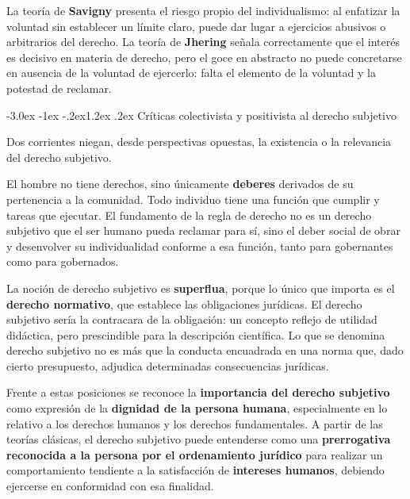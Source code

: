 \documentclass[12pt,oneside]{book}
\makeatletter
\renewcommand\section{\@startsection{section}{1}{\z@}%
  {-3.0ex \@plus -1ex \@minus -.2ex}{1.2ex \@plus .2ex}%
  {\normalfont\large\bfseries\color{acento}}}
\makeatother
\begin{document}
\begin{importante}
La teoría de \textbf{Savigny} presenta el riesgo propio del individualismo: al enfatizar la voluntad sin establecer un límite claro, puede dar lugar a ejercicios abusivos o arbitrarios del derecho. La teoría de \textbf{Jhering} señala correctamente que el interés es decisivo en materia de derecho, pero el goce en abstracto no puede concretarse en ausencia de la voluntad de ejercerlo: falta el elemento de la voluntad y la potestad de reclamar.
\end{importante}

\section{Críticas colectivista y positivista al derecho subjetivo}

Dos corrientes niegan, desde perspectivas opuestas, la existencia o la relevancia del derecho subjetivo.

\begin{definicion}
El hombre no tiene derechos, sino únicamente \textbf{deberes} derivados de su pertenencia a la comunidad. Todo individuo tiene una función que cumplir y tareas que ejecutar. El fundamento de la regla de derecho no es un derecho subjetivo que el ser humano pueda reclamar para sí, sino el deber social de obrar y desenvolver su individualidad conforme a esa función, tanto para gobernantes como para gobernados.
\end{definicion}

\begin{definicion}
La noción de derecho subjetivo es \textbf{superflua}, porque lo único que importa es el \textbf{derecho normativo}, que establece las obligaciones jurídicas. El derecho subjetivo sería la contracara de la obligación: un concepto reflejo de utilidad didáctica, pero prescindible para la descripción científica. Lo que se denomina derecho subjetivo no es más que la conducta encuadrada en una norma que, dado cierto presupuesto, adjudica determinadas consecuencias jurídicas.
\end{definicion}

Frente a estas posiciones se reconoce la \textbf{importancia del derecho subjetivo} como expresión de la \textbf{dignidad de la persona humana}, especialmente en lo relativo a los derechos humanos y los derechos fundamentales. A partir de las teorías clásicas, el derecho subjetivo puede entenderse como una \textbf{prerrogativa reconocida a la persona por el ordenamiento jurídico} para realizar un comportamiento tendiente a la satisfacción de \textbf{intereses humanos}, debiendo ejercerse en conformidad con esa finalidad.
\end{document}
